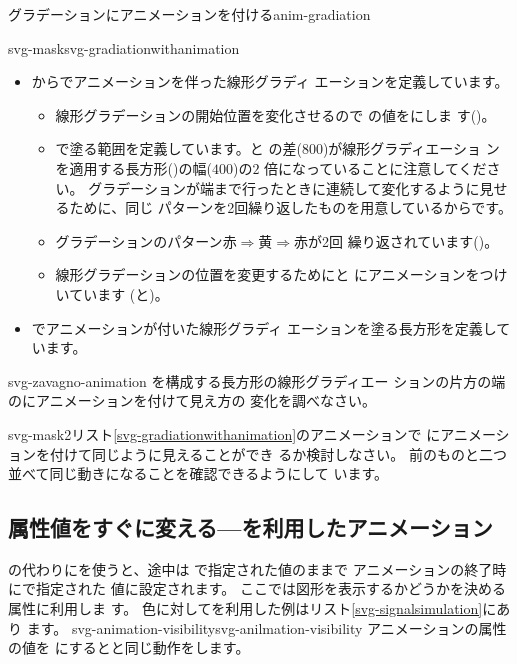 {グラデーションにアニメーションを付ける}{anim-gradiation} 

     {svg-mask}{svg-gradiationwithanimation}
\begin{itemize}
 \item {}からでアニメーションを伴った線形グラディ
       エーションを定義しています。
\begin{itemize}
 \item 線形グラデーションの開始位置を変化させるので
       の値をにしま
       す()。
 \item {}で塗る範囲を定義しています。と
       の差($800$)が線形グラディエーショ
       ンを適用する長方形()の幅($400$)の$2$
       倍になっていることに注意してください。
グラデーションが端まで行ったときに連続して変化するように見せるために、同じ
       パターンを2回繰り返したものを用意しているからです。
 \item グラデーションのパターン$赤\Rightarrow 黄\Rightarrow 赤$が2回
       繰り返されています()。
 \item 線形グラデーションの位置を変更するためにと
       にアニメーションをつけいています
       (と)。
\end{itemize}
 \item {}でアニメーションが付いた線形グラディ
       エーションを塗る長方形を定義しています。
\end{itemize}

{svg-zavagno-animation}
{%
を構成する長方形の線形グラディエー
 ションの片方の端のにアニメーションを付けて見え方の
 変化を調べなさい。}

{svg-mask2}{リスト\ref{svg-gradiationwithanimation}のアニメーションで
 にアニメーションを付けて同じように見えることができ
 るか検討しなさい。}
{前のものと二つ並べて同じ動きになることを確認できるようにして
 います。}

\subsection{属性値をすぐに変える---を利用したアニメーション}
\label{visibility-hidden}
の代わりにを使うと、途中は
で指定された値のままで
アニメーションの終了時にで指定された
値に設定されます。
ここでは図形を表示するかどうかを決める属性に利用しま
す。
%
\ifSeminor
\else
色に対してを利用した例はリスト\ref{svg-signalsimulation}にあり
ます。%
\fi
{}%
{svg-animation-visibility}{svg-anilmation-visibility}
アニメーションの属性の値を
にするとと同じ動作をします。
